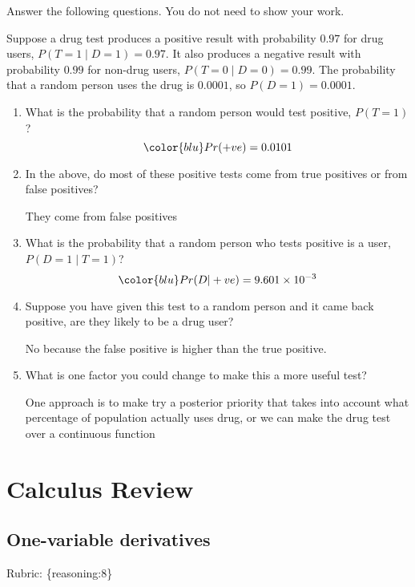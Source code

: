 \documentclass{article}
\def\rubric#1{\gre{Rubric: \{#1\}}}{}
\def\blu#1{{\color{blu}#1}}
\def\gre#1{{\color{gre}#1}}
\begin{document}
\blu{Answer the following questions.} You do not need to show your work.

Suppose a drug test produces a positive result with probability $0.97$ for drug users, $P(T=1 \mid D=1)=0.97$. It also produces a negative result with probability $0.99$ for non-drug users, $P(T=0 \mid D=0)=0.99$. The probability that a random person uses the drug is $0.0001$, so $P(D=1)=0.0001$.

\begin{enumerate}
\item What is the probability that a random person would test positive, $P(T=1)$?
\begin{equation}\color{blu} Pr(+ve)=0.0101 \end{equation}
\item In the above, do most of these positive tests come from true positives or from false positives?
\begin{center}\color{blu} They come from false positives \end{center}
\item What is the probability that a random person who tests positive is a user, $P(D=1 \mid T=1)$?
\begin{equation}\color{blu} Pr(D|+ve)= 9.601\times 10^{-3} \end{equation}
\item Suppose you have given this test to a random person and it came back positive, are they likely to be a drug user?
\begin{center}\color{blu} No because the false positive is higher than the true positive. \end{center}
\item What is one factor you could change to make this a more useful test?
\begin{center}\color{blu} One approach is to make try a posterior priority that takes into account what percentage of population actually uses drug, or we can make the drug test over a continuous function\end{center}
\end{enumerate}


\section{Calculus Review}



\subsection{One-variable derivatives}
\label{sub.one.var}
\rubric{reasoning:8}
\end{document}
